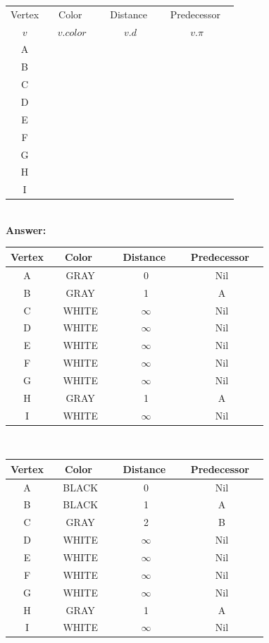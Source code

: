 \documentclass[12pt]{article}
\newcommand{\vs}{\vspace{2mm}}
\newcommand{\hs}{\hspace{10mm}}
\newcommand{\ha}{\hspace{1mm}}
\begin{document}
\begin{tabular}{|c|c|c|c|} \hline
  Vertex  & \hs\ \ha\  Color \hs\ \ha\ & \hs\  Distance \hs\ & \ha\ Predecessor \ha\  \\
  $v$ & $v.color$ & $v.d$ & $v.\pi$ \\ \hline
  A & & & \\ \hline
  B & & & \\ \hline
  C & & & \\ \hline
  D & & & \\ \hline
  E & & & \\ \hline
  F & & & \\ \hline
  G & & & \\ \hline
  H & & & \\ \hline
  I & & & \\ \hline
\end{tabular} \\

\textbf{Answer:}

\begin{tabular}{|c|c|c|c|} \hline
  Vertex  & \hs\ \ha\  Color \hs\ \ha\ & \hs\  Distance \hs\ & \ha\ Predecessor \ha\  \\ \hline
  A & GRAY & 0 & Nil \\ \hline
  B & GRAY & 1 & A \\ \hline
  C & WHITE & $\infty$ & Nil \\ \hline
  D & WHITE & $\infty$ & Nil \\ \hline
  E & WHITE & $\infty$ & Nil \\ \hline
  F & WHITE & $\infty$ & Nil \\ \hline
  G & WHITE & $\infty$ & Nil \\ \hline
  H & GRAY & 1 & A \\ \hline
  I & WHITE & $\infty$ & Nil \\ \hline
\end{tabular}
\vs\


\begin{tabular}{|c|c|c|c|} \hline
  Vertex  & \hs\ \ha\  Color \hs\ \ha\ & \hs\  Distance \hs\ & \ha\ Predecessor \ha\  \\ \hline
  A & BLACK & 0 & Nil \\ \hline
  B & BLACK & 1 & A \\ \hline
  C & GRAY & 2 & B \\ \hline
  D & WHITE & $\infty$ & Nil \\ \hline
  E & WHITE & $\infty$ & Nil \\ \hline
  F & WHITE & $\infty$ & Nil \\ \hline
  G & WHITE & $\infty$ & Nil \\ \hline
  H & GRAY & 1 & A \\ \hline
  I & WHITE & $\infty$ & Nil \\ \hline
\end{tabular}
\vs\
\end{document}
